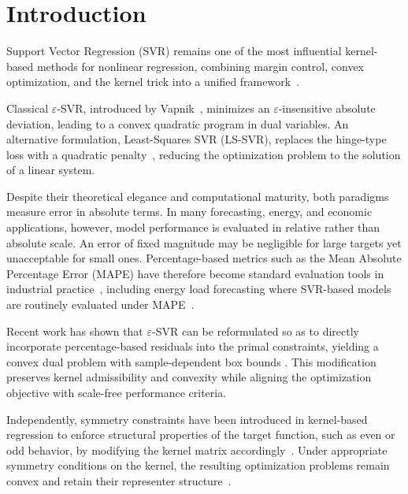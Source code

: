\documentclass[mathematics,article,submit,pdftex,moreauthors]{Definitions/mdpi}
\begin{document}

\section{Introduction}\label{sec:introduction}

Support Vector Regression (SVR) remains one of the most
influential kernel-based methods for nonlinear regression,
combining margin control, convex optimization, and the
kernel trick into a unified framework~\cite{Smola2004,Du2024}.

Classical $\varepsilon$-SVR, introduced by Vapnik~\cite{Vapnik1995},
minimizes an $\varepsilon$-insensitive absolute deviation,
leading to a convex quadratic program in dual variables.
An alternative formulation, Least-Squares SVR (LS-SVR),
replaces the hinge-type loss with a quadratic penalty~\cite{Suykens1999},
reducing the optimization problem to the solution of a
linear system.

Despite their theoretical elegance and computational
maturity, both paradigms measure error in absolute terms.
In many forecasting, energy, and economic applications,
however, model performance is evaluated in relative
rather than absolute scale.
An error of fixed magnitude may be negligible for large
targets yet unacceptable for small ones.
Percentage-based metrics such as the Mean Absolute
Percentage Error (MAPE) have therefore become standard
evaluation tools in industrial practice~\cite{Hyndman2006,Makridakis1993,DeMyttenaere2016,Makridakis2020},
including energy load forecasting where SVR-based models are routinely evaluated under MAPE~\cite{Wang2024}.

Recent work has shown that $\varepsilon$-SVR can be
reformulated so as to directly incorporate percentage-based
residuals into the primal constraints, yielding a convex dual
problem with sample-dependent box bounds
\cite{benavides2025support}.
This modification preserves kernel admissibility and
convexity while aligning the optimization objective with
scale-free performance criteria.

Independently, symmetry constraints have been introduced
in kernel-based regression to enforce structural properties
of the target function, such as even or odd behavior,
by modifying the kernel matrix accordingly~\cite{Espinoza2005,Espinoza2006}.
Under appropriate symmetry conditions on the kernel,
the resulting optimization problems remain convex and
retain their representer structure~\cite{Scholkopf2002}.
\end{document}
